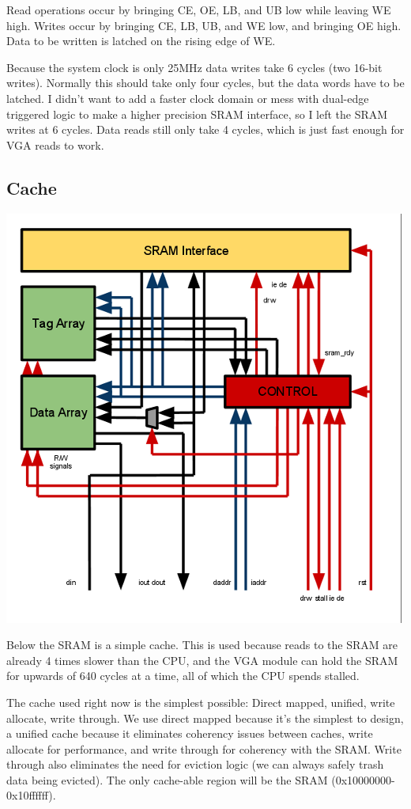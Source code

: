 \documentclass{article}
\begin{document}
Read operations occur by bringing CE, OE, LB, and UB low while leaving WE high. Writes occur by bringing CE, LB, UB, and WE low, and bringing OE high. Data to be written is latched on the rising edge of WE.

Because the system clock is only 25MHz data writes take 6 cycles (two 16-bit writes). Normally this should take only four cycles, but the data words have to be latched. I didn't want to add a faster clock domain or mess with dual-edge triggered logic to make a higher precision SRAM interface, so I left the SRAM writes at 6 cycles. Data reads still only take 4 cycles, which is just fast enough for VGA reads to work.

\subsection{Cache}

\includegraphics[scale=0.6]{CACHE.png} 

Below the SRAM is a simple cache. This is used because reads to the SRAM are already 4 times slower than the CPU, and the VGA module can hold the SRAM for upwards of 640 cycles at a time, all of which the CPU spends stalled.

The cache used right now is the simplest possible: Direct mapped, unified, write allocate, write through. We use direct mapped because it's the simplest to design, a unified cache because it eliminates coherency issues between caches, write allocate for performance, and write through for coherency with the SRAM. Write through also eliminates the need for eviction logic (we can always safely trash data being evicted). The only cache-able region will be the SRAM (0x10000000-0x10ffffff).
\end{document}
